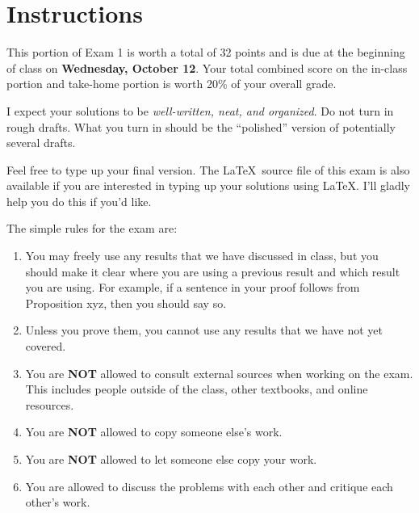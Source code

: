 \documentclass[11pt]{scrartcl}
\theoremstyle{definition}
\begin{document}
\begin{center}

  
  \bigskip
  

\end{center}

\section*{Instructions}

This portion of Exam 1 is worth a total of 32 points and is due at the beginning of class on \textbf{Wednesday, October 12}.  Your total combined score on the in-class portion and take-home portion is worth 20\% of your overall grade.  

\bigskip

I expect your solutions to be \emph{well-written, neat, and organized}.  Do not turn in rough drafts.  What you turn in should be the ``polished'' version of potentially several drafts.  
 
\bigskip

Feel free to type up your final version.  The \LaTeX\ source file of this exam is also available if you are interested in typing up your solutions using \LaTeX.  I'll gladly help you do this if you'd like.

\bigskip

The simple rules for the exam are:

\begin{enumerate}
\item You may freely use any results that we have discussed in class, but you should make it clear where you are using a previous result and which result you are using.  For example, if a sentence in your proof follows from Proposition xyz, then you should say so. 
\item Unless you prove them, you cannot use any results that we have not yet covered.
\item You are \textbf{NOT} allowed to consult external sources when working on the exam.  This includes people outside of the class, other textbooks, and online resources.
\item You are \textbf{NOT} allowed to copy someone else's work.
\item You are \textbf{NOT} allowed to let someone else copy your work.
\item You are allowed to discuss the problems with each other and critique each other's work.
\end{enumerate}
\end{document}
